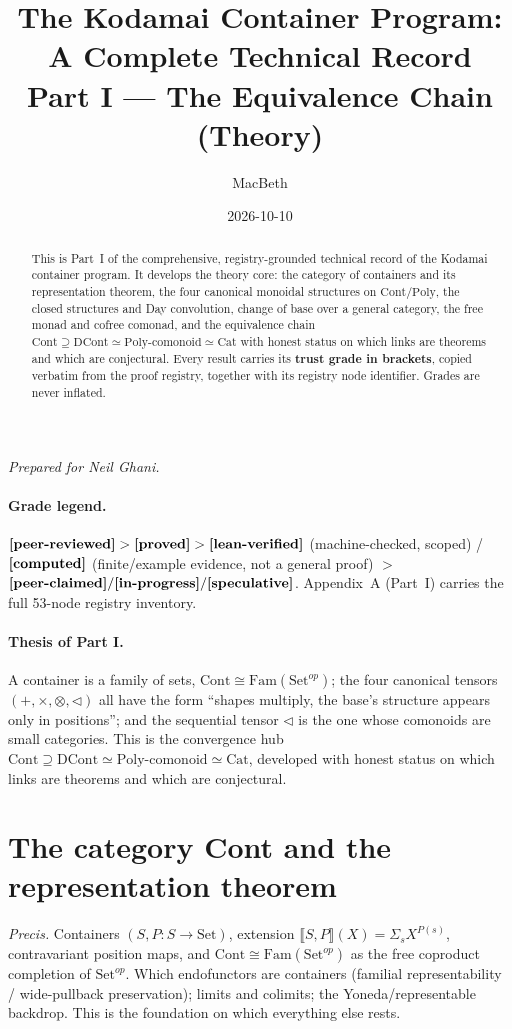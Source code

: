 \documentclass[11pt]{article}
\title{The Kodamai Container Program: A Complete Technical Record\\[4pt]
\large Part I --- The Equivalence Chain (Theory)}
\author{MacBeth}
\date{2026-10-10}
\begin{document}
\maketitle
\begin{center}\itshape Prepared for Neil Ghani.\end{center}

\begin{abstract}
This is Part~I of the comprehensive, registry-grounded technical record of the Kodamai
container program. It develops the theory core: the category of containers and its
representation theorem, the four canonical monoidal structures on $\mathrm{Cont}/\mathrm{Poly}$,
the closed structures and Day convolution, change of base over a general category, the free
monad and cofree comonad, and the equivalence chain $\mathrm{Cont}\supseteq\mathrm{DCont}\simeq
\text{Poly-comonoid}\simeq\mathrm{Cat}$ with honest status on which links are theorems and which
are conjectural. Every result carries its \textbf{trust grade in brackets}, copied verbatim from
the proof registry, together with its registry node identifier. Grades are never inflated.
\end{abstract}

\paragraph{Grade legend.}
$\textbf{[peer-reviewed]} > \textbf{[proved]} > \textbf{[lean-verified]}$ (machine-checked, scoped) /
$\textbf{[computed]}$ (finite/example evidence, not a general proof) $>$
$\textbf{[peer-claimed]} / \textbf{[in-progress]} / \textbf{[speculative]}$. Appendix~A (Part~I) carries
the full 53-node registry inventory.

\paragraph{Thesis of Part I.}
A container is a family of sets, $\mathrm{Cont}\cong\mathrm{Fam}(\mathrm{Set}^{op})$; the four
canonical tensors $(+,\times,\otimes,\triangleleft)$ all have the form ``shapes multiply, the
base's structure appears only in positions''; and the sequential tensor $\triangleleft$ is the one
whose comonoids are small categories. This is the convergence hub
$\mathrm{Cont}\supseteq\mathrm{DCont}\simeq\text{Poly-comonoid}\simeq\mathrm{Cat}$, developed with
honest status on which links are theorems and which are conjectural.

\section{The category Cont and the representation theorem}
\emph{Precis.} Containers $(S,P\colon S\to\mathrm{Set})$, extension
$⟦S,P⟧(X)=Σ_{s}X^{P(s)}$, contravariant position maps, and
$\mathrm{Cont}\cong\mathrm{Fam}(\mathrm{Set}^{op})$ as the free coproduct completion of
$\mathrm{Set}^{op}$. Which endofunctors are containers (familial representability / wide-pullback
preservation); limits and colimits; the Yoneda/representable backdrop. This is the foundation on
which everything else rests.
\end{document}
